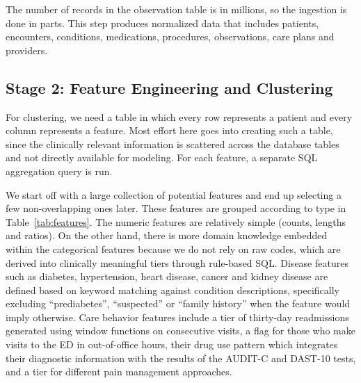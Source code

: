 The number of records in the observation table is in millions, so the ingestion is done in parts. This step produces normalized data that includes patients, encounters, conditions, medications, procedures, observations, care plans and providers.

\subsection{Stage 2: Feature Engineering and Clustering}
For clustering, we need a table in which every row represents a patient and every column represents a feature. Most effort here goes into creating such a table, since the clinically relevant information is scattered across the database tables and not directly available for modeling. For each feature, a separate SQL aggregation query is run.

We start off with a large collection of potential features and end up selecting a few non-overlapping ones later. These features are grouped according to type in Table~\ref{tab:features}. The numeric features are relatively simple (counts, lengths and ratios). On the other hand, there is more domain knowledge embedded within the categorical features because we do not rely on raw codes, which are derived into clinically meaningful tiers through rule-based SQL. Disease features such as diabetes, hypertension, heart disease, cancer and kidney disease are defined based on keyword matching against condition descriptions, specifically excluding ``prediabetes'', ``suspected'' or ``family history'' when the feature would imply otherwise. Care behavior features include a tier of thirty-day readmissions generated using window functions on consecutive visits, a flag for those who make visits to the ED in out-of-office hours, their drug use pattern which integrates their diagnostic information with the results of the AUDIT-C and DAST-10 tests, and a tier for different pain management approaches.

